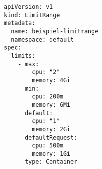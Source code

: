 \begin{verbatim}
apiVersion: v1
kind: LimitRange
metadata:
  name: beispiel-limitrange
  namespace: default
spec:
  limits:
    - max:
        cpu: "2"
        memory: 4Gi
      min:
        cpu: 200m
        memory: 6Mi
      default:
        cpu: "1"
        memory: 2Gi
      defaultRequest:
        cpu: 500m
        memory: 1Gi
      type: Container

\end{verbatim}